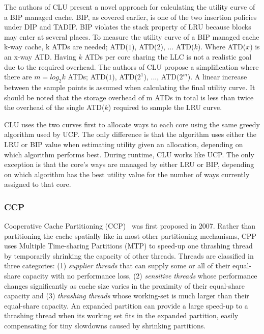 The authors of CLU present a novel approach for calculating the utility curve of a BIP managed cache.
BIP, as covered earlier, is one of the two insertion policies under DIP and TADIP. 
BIP violates the stack property of LRU because blocks may enter at several places.
To measure the utility curve of a BIP managed cache k-way cache, k ATDs are needed; ATD($1$), ATD($2$), ... ATD($k$). 
Where ATD($x$) is an x-way ATD.
Having $k$ ATDs per core sharing the LLC is not a realistic goal due to the required overhead.
The authors of CLU propose a simplification where there are $m = log_2 k$ ATDs; ATD($1$), ATD($2^1$), ..., ATD($2^m$).
A linear increase between the sample points is assumed when calculating the final utility curve.
It should be noted that the storage overhead of m ATDs in total is less than twice the overhead of the single ATD($k$) required to sample the LRU curve.

CLU uses the two curves first to allocate ways to each core using the same greedy algorithm used by UCP.
The only difference is that the algorithm uses either the LRU or BIP value when estimating utility given an allocation, depending on which algorithm performs best.
During runtime, CLU works like UCP.
The only exception is that the core's ways are managed by either LRU or BIP, depending on which algorithm has the best utility value for the number of ways currently assigned to that core.

\subsubsection{CCP}

Cooperative Cache Partitioning (CCP)~\cite{cooperativeCachePartitioning} was first proposed in 2007. 
Rather than partitioning the cache spatially like in most other partitioning mechanisms, CPP uses Multiple Time-sharing Partitions (MTP) to speed-up one thrashing thread by temporarily shrinking the capacity of other threads. 
Threads are classified in three categories: (1) \textit{supplier threads} that can supply some or all of their equal-share capacity with no performance loss, (2) \textit{sensitive threads} whose performance changes significantly as cache size varies in the proximity of their equal-share capacity and (3) \textit{thrashing threads} whose working-set is much larger than their equal-share capacity.
An expanded partition can provide a large speed-up to a thrashing thread when its working set fits in the expanded partition, easily compensating for tiny slowdowns caused by shrinking partitions. 

